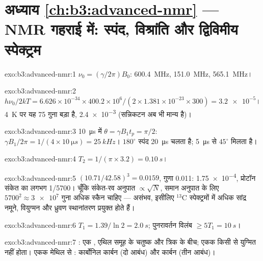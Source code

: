 \section*{अध्याय \ref{ch:b3:advanced-nmr} --- NMR गहराई में: स्पंद, विश्रांति और द्विविमीय स्पेक्ट्रम}

\begin{solution}{exo:b3:advanced-nmr:1}
$\nu_0 = (\gamma/2\pi)B_0$:  \qty{600.4}{MHz},  \qty{151.0}{MHz}, 
\qty{565.1}{MHz}।
\end{solution}

\begin{solution}{exo:b3:advanced-nmr:2}
$h\nu_0/2kT = 6.626\times10^{-34} \times 400.2\times10^6/(2 \times 1.381\times10^{-23} \times 300)
= \num{3.2e-5}$। \qty{4}{K} पर यह 75 गुना बड़ा है, \num{2.4e-3} (सन्निकटन
अब भी मान्य है)।
\end{solution}

\begin{solution}{exo:b3:advanced-nmr:3}
\qty{10}{\micro s} में $\theta = \gamma B_1t_p = \pi/2$: $\gamma B_1/2\pi = 1/(4 \times
\qty{10}{\micro s}) = \qty{25}{kHz}$। $180^\circ$ स्पंद \qty{20}{\micro s} चलता है; \qty{5}{\micro s}
से $45^\circ$ मिलता है।
\end{solution}

\begin{solution}{exo:b3:advanced-nmr:4}
$T_2 = 1/(\pi \times 3.2) = \qty{0.10}{s}$।
\end{solution}

\begin{solution}{exo:b3:advanced-nmr:5}
$(10.71/42.58)^3 = 0.0159$, गुणा 0.011: \num{1.75e-4}, प्रोटॉन संकेत का लगभग
1/5700। चूँकि संकेत-रव अनुपात $\propto\sqrt N$, समान अनुपात के लिए $5700^2 \approx \num{3e7}$ गुना अधिक
स्कैन चाहिए --- असंभव, इसीलिए ${}^{13}$C स्पेक्ट्रमों में अधिक सांद्र नमूने,
वियुग्मन और ध्रुवण स्थानांतरण प्रयुक्त होते हैं।
\end{solution}

\begin{solution}{exo:b3:advanced-nmr:6}
$T_1 = 1.39/\ln2 = \qty{2.0}{s}$; पुनरावर्तन विलंब $\ge 5T_1 = \qty{10}{s}$।
\end{solution}

\begin{solution}{exo:b3:advanced-nmr:7}
: एक , एथिल समूह के  चतुष्क और  त्रिक के बीच;
 एकक किसी से युग्मित नहीं होता। एकक मेथिल से :
कार्बोनिल कार्बन (दो आबंध) और  कार्बन (तीन आबंध)।
\end{solution}


